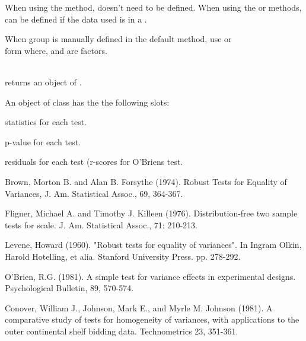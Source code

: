\documentclass[a4paper]{book}
\begin{document}
%
\begin{Details}\relax
When using the  method,  doesn't need to be defined. When using the
 or  methods,  can be defined if the data used
is in a .

When group is manually defined in the default method, use  or\\{}
form where,  and 
are factors.\\{}\\{}


\end{Details}
%
\begin{Value}
 returns an object of  .

An object of class  has the the following slots:

\begin{ldescription}
\item[\code{statistics}] statistics for each test.
\item[\code{p.value}] p-value for each test.
\item[\code{residuals}] residuals for each test (r-scores for O'Briens test.


\end{ldescription}
\end{Value}
%
\begin{References}\relax
Brown, Morton B. and Alan B. Forsythe  (1974). Robust Tests for Equality of Variances, J. Am. Statistical Assoc., 69, 364-367.

Fligner, Michael A. and Timothy J. Killeen (1976). Distribution-free two sample tests for scale. J. Am. Statistical Assoc., 71: 210-213.

Levene, Howard (1960). "Robust tests for equality of variances". In Ingram Olkin, Harold Hotelling, et alia. Stanford University Press. pp. 278-292.

O'Brien, R.G. (1981). A simple test for variance effects in experimental designs. Psychological Bulletin, 89, 570-574.

Conover, William J., Johnson, Mark E., and Myrle M. Johnson (1981). A comparative study of tests for homogeneity of variances, with applications to the outer continental shelf bidding data. Technometrics 23, 351-361. 
\end{References}
%
\begin{SeeAlso}\relax
{}
\end{SeeAlso}
\end{document}
